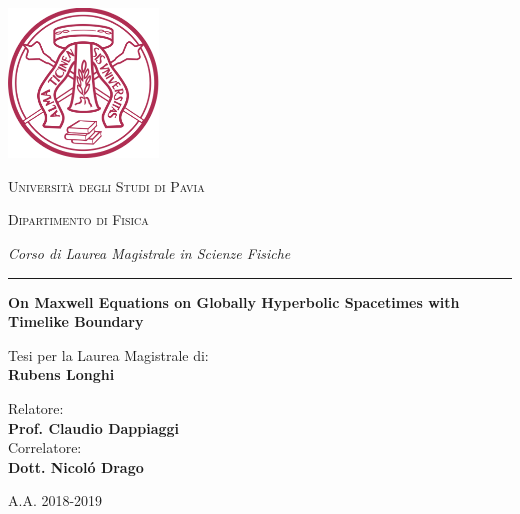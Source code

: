 \documentclass[11pt,a4paper,twoside,openany]{book}
\begin{document}
\begin{titlepage}
	\centering
	\includegraphics[width=0.3\textwidth]{unipv}\par\vspace{0.5cm}
	{\scshape\huge Universit\`a degli Studi di Pavia\par}
	\vspace{0.5cm}
	{\scshape\LARGE Dipartimento di Fisica\par
		\vspace{0.2cm}
		\Large\textit{Corso di Laurea Magistrale in Scienze Fisiche}\par}
	\vspace{0.5cm}
	\rule{14cm}{0.1pt}
	
	\vspace{1.5cm}
	{\huge\bfseries On Maxwell Equations on Globally Hyperbolic Spacetimes with Timelike Boundary \par}
	\vspace{1.5cm}
	\vfill\large\begin{flushright} Tesi per la Laurea Magistrale di:\\ \textbf{Rubens Longhi} %
	\end{flushright}
	\vspace{.5cm}
	\begin{flushleft}
		Relatore:\\
		\textbf{Prof. Claudio Dappiaggi}\\[.3cm] %
		Correlatore:\\
		\textbf{Dott. Nicol\'o Drago}\\[.3cm] %
	\end{flushleft}
	
	
	
	\vfill
	
	{\large A.A. 2018-2019\par}
\end{titlepage}
   
   \blankpage
   
   
   \newenvironment{abstract}%
   {\null\vfill\begin{center}%
   		\bfseries Abstract \end{center}}%
   {\vfill\null}
   
\end{document}
